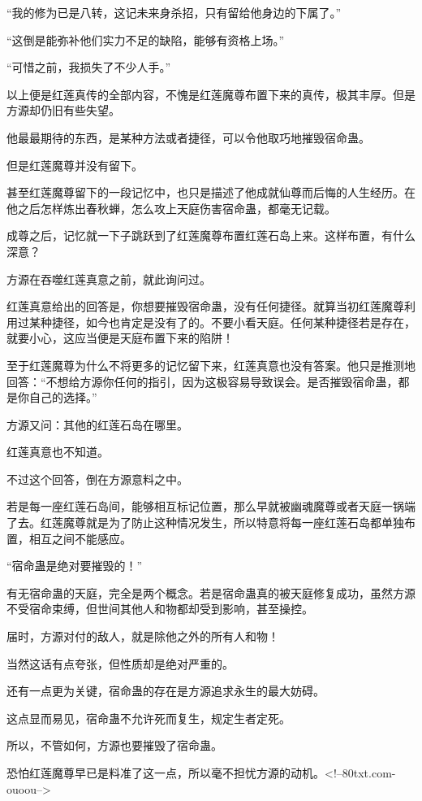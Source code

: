 \begin{this_body}
“我的修为已是八转，这记未来身杀招，只有留给他身边的下属了。”

“这倒是能弥补他们实力不足的缺陷，能够有资格上场。”

“可惜之前，我损失了不少人手。”

以上便是红莲真传的全部内容，不愧是红莲魔尊布置下来的真传，极其丰厚。但是方源却仍旧有些失望。

他最最期待的东西，是某种方法或者捷径，可以令他取巧地摧毁宿命蛊。

但是红莲魔尊并没有留下。

甚至红莲魔尊留下的一段记忆中，也只是描述了他成就仙尊而后悔的人生经历。在他之后怎样炼出春秋蝉，怎么攻上天庭伤害宿命蛊，都毫无记载。

成尊之后，记忆就一下子跳跃到了红莲魔尊布置红莲石岛上来。这样布置，有什么深意？

方源在吞噬红莲真意之前，就此询问过。

红莲真意给出的回答是，你想要摧毁宿命蛊，没有任何捷径。就算当初红莲魔尊利用过某种捷径，如今也肯定是没有了的。不要小看天庭。任何某种捷径若是存在，就要小心，这应当便是天庭布置下来的陷阱！

至于红莲魔尊为什么不将更多的记忆留下来，红莲真意也没有答案。他只是推测地回答：“不想给方源你任何的指引，因为这极容易导致误会。是否摧毁宿命蛊，都是你自己的选择。”

方源又问：其他的红莲石岛在哪里。

红莲真意也不知道。

不过这个回答，倒在方源意料之中。

若是每一座红莲石岛间，能够相互标记位置，那么早就被幽魂魔尊或者天庭一锅端了去。红莲魔尊就是为了防止这种情况发生，所以特意将每一座红莲石岛都单独布置，相互之间不能感应。

“宿命蛊是绝对要摧毁的！”

有无宿命蛊的天庭，完全是两个概念。若是宿命蛊真的被天庭修复成功，虽然方源不受宿命束缚，但世间其他人和物都却受到影响，甚至操控。

届时，方源对付的敌人，就是除他之外的所有人和物！

当然这话有点夸张，但性质却是绝对严重的。

还有一点更为关键，宿命蛊的存在是方源追求永生的最大妨碍。

这点显而易见，宿命蛊不允许死而复生，规定生者定死。

所以，不管如何，方源也要摧毁了宿命蛊。

恐怕红莲魔尊早已是料准了这一点，所以毫不担忧方源的动机。<!--80txt.com-ouoou-->

\end{this_body}

